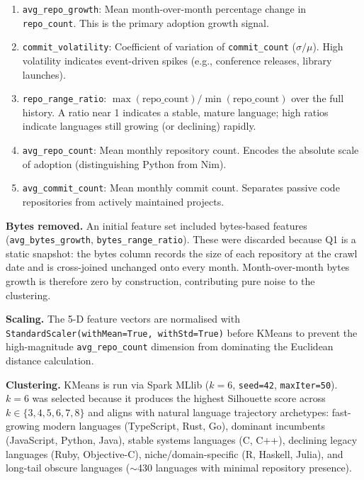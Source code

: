 \documentclass[conference]{IEEEtran}
\begin{document}
\begin{enumerate}
  \item \texttt{avg\_repo\_growth}: Mean month-over-month percentage change
        in \texttt{repo\_count}. This is the primary adoption growth signal.
  \item \texttt{commit\_volatility}: Coefficient of variation of
        \texttt{commit\_count} ($\sigma / \mu$). High volatility indicates
        event-driven spikes (e.g., conference releases, library launches).
  \item \texttt{repo\_range\_ratio}: $\max(\text{repo\_count}) /
        \min(\text{repo\_count})$ over the full history. A ratio near 1
        indicates a stable, mature language; high ratios indicate languages
        still growing (or declining) rapidly.
  \item \texttt{avg\_repo\_count}: Mean monthly repository count. Encodes
        the absolute scale of adoption (distinguishing Python from Nim).
  \item \texttt{avg\_commit\_count}: Mean monthly commit count. Separates
        passive code repositories from actively maintained projects.
\end{enumerate}

\textbf{Bytes removed.} An initial feature set included bytes-based
features (\texttt{avg\_bytes\_growth}, \texttt{bytes\_range\_ratio}).
These were discarded because Q1 is a static snapshot: the bytes column
records the size of each repository at the crawl date and is cross-joined
unchanged onto every month. Month-over-month bytes growth is therefore zero
by construction, contributing pure noise to the clustering.

\textbf{Scaling.} The 5-D feature vectors are normalised with
\texttt{StandardScaler(withMean=True, withStd=True)} before KMeans to
prevent the high-magnitude \texttt{avg\_repo\_count} dimension from
dominating the Euclidean distance calculation.

\textbf{Clustering.} KMeans is run via Spark MLlib ($k=6$, \texttt{seed=42},
\texttt{maxIter=50}). $k=6$ was selected because it produces the highest
Silhouette score across $k \in \{3, 4, 5, 6, 7, 8\}$ and aligns with
natural language trajectory archetypes: fast-growing modern languages
(TypeScript, Rust, Go), dominant incumbents (JavaScript, Python, Java),
stable systems languages (C, C++), declining legacy languages (Ruby,
Objective-C), niche/domain-specific (R, Haskell, Julia), and long-tail
obscure languages ($\sim$430 languages with minimal repository presence).
\end{document}
